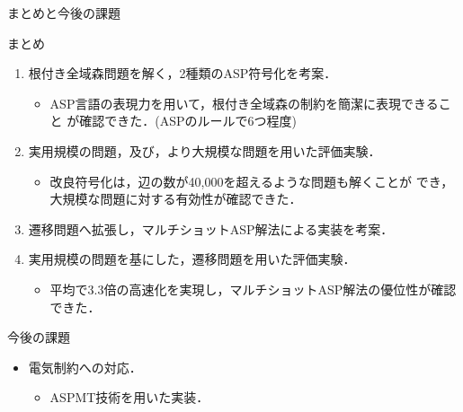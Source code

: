 \documentclass[dvipdfmx,11pt]{beamer}
\begin{document}
\begin{frame}{まとめと今後の課題}
 \begin{block}{まとめ}
  \begin{enumerate}
   \item 根付き全域森問題を解く，2種類のASP符号化を考案．
   \begin{itemize}
	\item ASP言語の表現力を用いて，根付き全域森の制約を簡潔に表現できること
		  が確認できた．(ASPのルールで6つ程度)
   \end{itemize}
   \item 実用規模の問題，及び，より大規模な問題を用いた評価実験．
   \begin{itemize}
	\item 改良符号化は，辺の数が40,000を超えるような問題も解くことが
		  でき，大規模な問題に対する有効性が確認できた．
   \end{itemize}
   \item 遷移問題へ拡張し，マルチショットASP解法による実装を考案．
   \item 実用規模の問題を基にした，遷移問題を用いた評価実験．
   \begin{itemize}
	\item 平均で3.3倍の高速化を実現し，マルチショットASP解法の優位性が確認できた．
   \end{itemize}
  \end{enumerate}
 \end{block}
 
 \begin{alertblock}{今後の課題}
  \begin{itemize}
   \item 電気制約への対応．
		 \begin{itemize}
		  \item ASPMT技術を用いた実装．
		 \end{itemize}
  \end{itemize}
 \end{alertblock}
\end{frame}




\end{document}
